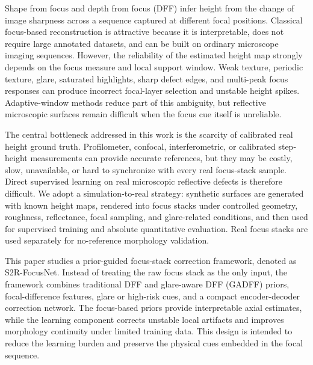 \documentclass[11pt,a4paper]{article}
\newcommand{\method}{S2R-FocusNet}
\begin{document}
Shape from focus and depth from focus (DFF) infer height from the change of image sharpness across a sequence captured at different focal positions. Classical focus-based reconstruction is attractive because it is interpretable, does not require large annotated datasets, and can be built on ordinary microscope imaging sequences. However, the reliability of the estimated height map strongly depends on the focus measure and local support window. Weak texture, periodic texture, glare, saturated highlights, sharp defect edges, and multi-peak focus responses can produce incorrect focal-layer selection and unstable height spikes. Adaptive-window methods reduce part of this ambiguity, but reflective microscopic surfaces remain difficult when the focus cue itself is unreliable.

The central bottleneck addressed in this work is the scarcity of calibrated real height ground truth. Profilometer, confocal, interferometric, or calibrated step-height measurements can provide accurate references, but they may be costly, slow, unavailable, or hard to synchronize with every real focus-stack sample. Direct supervised learning on real microscopic reflective defects is therefore difficult. We adopt a simulation-to-real strategy: synthetic surfaces are generated with known height maps, rendered into focus stacks under controlled geometry, roughness, reflectance, focal sampling, and glare-related conditions, and then used for supervised training and absolute quantitative evaluation. Real focus stacks are used separately for no-reference morphology validation.

This paper studies a prior-guided focus-stack correction framework, denoted as \method. Instead of treating the raw focus stack as the only input, the framework combines traditional DFF and glare-aware DFF (GADFF) priors, focal-difference features, glare or high-risk cues, and a compact encoder-decoder correction network. The focus-based priors provide interpretable axial estimates, while the learning component corrects unstable local artifacts and improves morphology continuity under limited training data. This design is intended to reduce the learning burden and preserve the physical cues embedded in the focal sequence.
\end{document}
